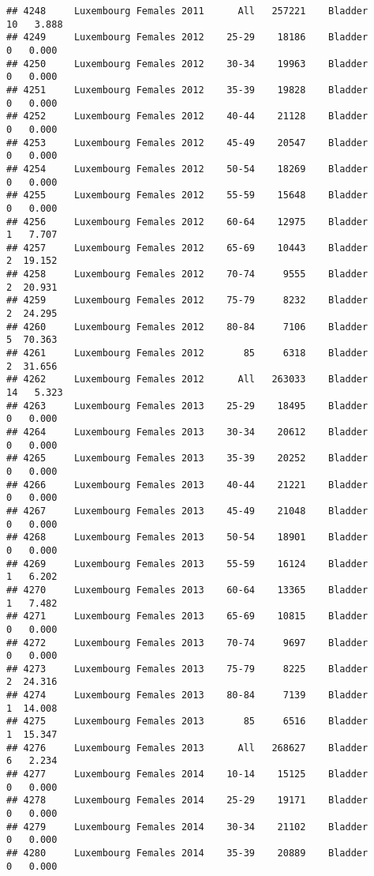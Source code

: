 \documentclass[
]{article}
\begin{document}
\begin{verbatim}
## 4248     Luxembourg Females 2011      All   257221    Bladder     10   3.888
## 4249     Luxembourg Females 2012    25-29    18186    Bladder      0   0.000
## 4250     Luxembourg Females 2012    30-34    19963    Bladder      0   0.000
## 4251     Luxembourg Females 2012    35-39    19828    Bladder      0   0.000
## 4252     Luxembourg Females 2012    40-44    21128    Bladder      0   0.000
## 4253     Luxembourg Females 2012    45-49    20547    Bladder      0   0.000
## 4254     Luxembourg Females 2012    50-54    18269    Bladder      0   0.000
## 4255     Luxembourg Females 2012    55-59    15648    Bladder      0   0.000
## 4256     Luxembourg Females 2012    60-64    12975    Bladder      1   7.707
## 4257     Luxembourg Females 2012    65-69    10443    Bladder      2  19.152
## 4258     Luxembourg Females 2012    70-74     9555    Bladder      2  20.931
## 4259     Luxembourg Females 2012    75-79     8232    Bladder      2  24.295
## 4260     Luxembourg Females 2012    80-84     7106    Bladder      5  70.363
## 4261     Luxembourg Females 2012       85     6318    Bladder      2  31.656
## 4262     Luxembourg Females 2012      All   263033    Bladder     14   5.323
## 4263     Luxembourg Females 2013    25-29    18495    Bladder      0   0.000
## 4264     Luxembourg Females 2013    30-34    20612    Bladder      0   0.000
## 4265     Luxembourg Females 2013    35-39    20252    Bladder      0   0.000
## 4266     Luxembourg Females 2013    40-44    21221    Bladder      0   0.000
## 4267     Luxembourg Females 2013    45-49    21048    Bladder      0   0.000
## 4268     Luxembourg Females 2013    50-54    18901    Bladder      0   0.000
## 4269     Luxembourg Females 2013    55-59    16124    Bladder      1   6.202
## 4270     Luxembourg Females 2013    60-64    13365    Bladder      1   7.482
## 4271     Luxembourg Females 2013    65-69    10815    Bladder      0   0.000
## 4272     Luxembourg Females 2013    70-74     9697    Bladder      0   0.000
## 4273     Luxembourg Females 2013    75-79     8225    Bladder      2  24.316
## 4274     Luxembourg Females 2013    80-84     7139    Bladder      1  14.008
## 4275     Luxembourg Females 2013       85     6516    Bladder      1  15.347
## 4276     Luxembourg Females 2013      All   268627    Bladder      6   2.234
## 4277     Luxembourg Females 2014    10-14    15125    Bladder      0   0.000
## 4278     Luxembourg Females 2014    25-29    19171    Bladder      0   0.000
## 4279     Luxembourg Females 2014    30-34    21102    Bladder      0   0.000
## 4280     Luxembourg Females 2014    35-39    20889    Bladder      0   0.000

\end{verbatim}
\end{document}
